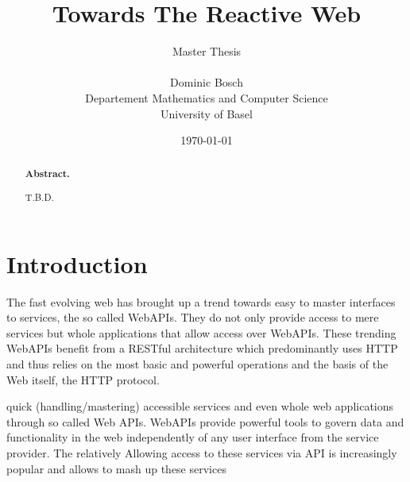 \documentclass[11pt]{article}%
\newcommand{\subtitle}[1]{%
  \posttitle{%
    \par\end{center}
    \begin{center}\large#1\end{center}
    \vskip0.5em}%
}
\begin{document}
\title{\huge Towards The Reactive Web\vspace*{15 mm}}
\date{\today}
\author{\fontsize{11}{9}\selectfont
Master Thesis\\
\vspace*{10 mm}\\
Dominic Bosch\\
Departement Mathematics and Computer Science\\
University of Basel
}
\maketitle

\renewcommand{\abstractname}{}
\begin{abstract}
\textbf{Abstract.}

T.B.D.

\end{abstract}


\newpage
\tableofcontents
\newpage



\section{Introduction}
%
%




The fast evolving web has brought up a trend towards easy to master interfaces to services, the so called WebAPIs.
They do not only provide access to mere services but whole applications that allow access over WebAPIs.
These trending WebAPIs benefit from a RESTful architecture which predominantly uses HTTP and thus relies on the most basic and powerful operations and the basis of the Web itself, the HTTP protocol. 

quick (handling/mastering) accessible services and even whole web applications through so called Web APIs.
WebAPIs provide powerful tools to govern data and functionality in the web independently of any user interface from the service provider.
The relatively
Allowing access to these services via API is increasingly popular and allows to mash up these services
\end{document}
